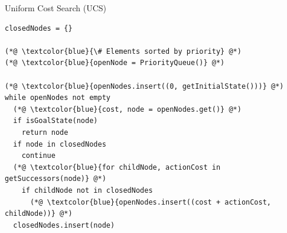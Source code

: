 \documentclass{beamer}
\begin{document}
\begin{frame}[fragile]{Uniform Cost Search (UCS)}
	\begin{lstlisting}
closedNodes = {}

(*@ \textcolor{blue}{\# Elements sorted by priority} @*)
(*@ \textcolor{blue}{openNode = PriorityQueue()} @*)

(*@ \textcolor{blue}{openNodes.insert((0, getInitialState()))} @*)
while openNodes not empty 
  (*@ \textcolor{blue}{cost, node = openNodes.get()} @*)
  if isGoalState(node)
    return node
  if node in closedNodes
    continue				
  (*@ \textcolor{blue}{for childNode, actionCost in getSuccessors(node)} @*)
    if childNode not in closedNodes
      (*@ \textcolor{blue}{openNodes.insert((cost + actionCost, childNode))} @*)
  closedNodes.insert(node)
	\end{lstlisting}
\end{frame}
\end{document}
